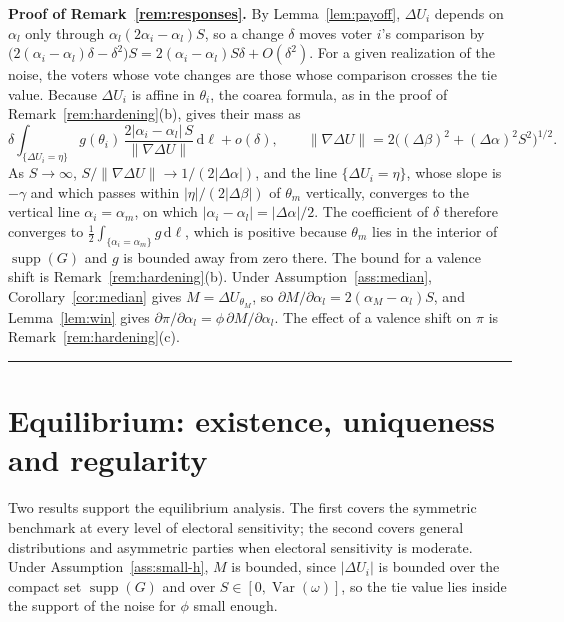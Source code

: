 \documentclass[12pt,letterpaper]{article}
\newenvironment{proof}[1][Proof]{\noindent\textbf{#1.} }{\ \rule{0.5em}{0.5em}}
\begin{document}
\begin{proof}[Proof of Remark~\ref{rem:responses}]
By Lemma~\ref{lem:payoff}, $\Delta U_i$ depends on $\alpha_l$ only through $\alpha_l(2\alpha_i-\alpha_l)S$, so a change $\delta$ moves voter $i$'s comparison by $\big(2(\alpha_i-\alpha_l)\delta-\delta^2\big)S=2(\alpha_i-\alpha_l)S\delta+O(\delta^2)$. For a given realization of the noise, the voters whose vote changes are those whose comparison crosses the tie value. Because $\Delta U_i$ is affine in $\theta_i$, the coarea formula, as in the proof of Remark~\ref{rem:hardening}(b), gives their mass as
\[
\delta\int_{\{\Delta U_i=\eta\}}g(\theta_i)\,\frac{2|\alpha_i-\alpha_l|\,S}{\|\nabla\Delta U\|}\,\mathrm{d}\ell+o(\delta),
\qquad
\|\nabla\Delta U\|=2\big((\Delta\beta)^2+(\Delta\alpha)^2S^2\big)^{1/2}.
\]
As $S\to\infty$, $S/\|\nabla\Delta U\|\to1/(2|\Delta\alpha|)$, and the line $\{\Delta U_i=\eta\}$, whose slope is $-\gamma$ and which passes within $|\eta|/(2|\Delta\beta|)$ of $\theta_m$ vertically, converges to the vertical line $\alpha_i=\alpha_m$, on which $|\alpha_i-\alpha_l|=|\Delta\alpha|/2$. The coefficient of $\delta$ therefore converges to $\tfrac12\int_{\{\alpha_i=\alpha_m\}}g\,\mathrm{d}\ell$, which is positive because $\theta_m$ lies in the interior of $\operatorname{supp}(G)$ and $g$ is bounded away from zero there. The bound for a valence shift is Remark~\ref{rem:hardening}(b). Under Assumption~\ref{ass:median}, Corollary~\ref{cor:median} gives $M=\Delta U_{\theta_M}$, so $\partial M/\partial\alpha_l=2(\alpha_M-\alpha_l)S$, and Lemma~\ref{lem:win} gives $\partial\pi/\partial\alpha_l=\phi\,\partial M/\partial\alpha_l$. The effect of a valence shift on $\pi$ is Remark~\ref{rem:hardening}(c).
\end{proof}

\section{Equilibrium: existence, uniqueness and regularity}\label{app:small-h}

Two results support the equilibrium analysis. The first covers the symmetric benchmark at every level of electoral sensitivity; the second covers general distributions and asymmetric parties when electoral sensitivity is moderate. Under Assumption~\ref{ass:small-h}, $M$ is bounded, since $|\Delta U_i|$ is bounded over the compact set $\operatorname{supp}(G)$ and over $S\in[0,\operatorname{Var}(\omega)]$, so the tie value lies inside the support of the noise for $\phi$ small enough.
\end{document}
